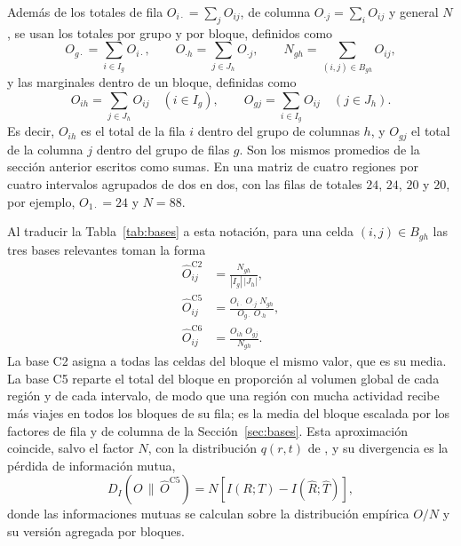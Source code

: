 Además de los totales de fila $O_{i\cdot} = \sum_j O_{ij}$, de columna
$O_{\cdot j} = \sum_i O_{ij}$ y general $N$, se usan los totales por grupo y por
bloque, definidos como
\[
  O_{g\cdot} = \sum_{i \in I_g} O_{i\cdot}, \qquad
  O_{\cdot h} = \sum_{j \in J_h} O_{\cdot j}, \qquad
  N_{gh} = \sum_{(i,j) \in B_{gh}} O_{ij},
\]
y las marginales dentro de un bloque, definidas como
\[
  O_{ih} = \sum_{j \in J_h} O_{ij} \quad (i \in I_g), \qquad
  O_{gj} = \sum_{i \in I_g} O_{ij} \quad (j \in J_h).
\]
Es decir, $O_{ih}$ es el total de la fila $i$ dentro del grupo de columnas $h$, y
$O_{gj}$ el total de la columna $j$ dentro del grupo de filas $g$. Son los mismos
promedios de la sección anterior escritos como sumas. En una matriz de cuatro
regiones por cuatro intervalos agrupados de dos en dos, con las filas de
totales $24$, $24$, $20$ y $20$, por ejemplo, $O_{1\cdot} = 24$ y $N = 88$.

Al traducir la Tabla~\ref{tab:bases} a esta notación, para una celda
$(i,j) \in B_{gh}$ las tres bases relevantes toman la forma
\begin{align}
  \hat{O}^{\mathrm{C2}}_{ij} &= \frac{N_{gh}}{|I_g|\,|J_h|}, \label{eq:c2}\\[4pt]
  \hat{O}^{\mathrm{C5}}_{ij} &= \frac{O_{i\cdot}\; O_{\cdot j}\; N_{gh}}{O_{g\cdot}\; O_{\cdot h}}, \label{eq:c5}\\[4pt]
  \hat{O}^{\mathrm{C6}}_{ij} &= \frac{O_{ih}\; O_{gj}}{N_{gh}}. \label{eq:c6}
\end{align}
La base C2 asigna a todas las celdas del bloque el mismo valor, que es su media. La base
C5 reparte el total del bloque en proporción al volumen global de cada región y de
cada intervalo, de modo que una región con mucha actividad recibe más viajes en
todos los bloques de su fila; es la media del bloque escalada por los factores de
fila y de columna de la Sección~\ref{sec:bases}. Esta aproximación coincide, salvo el factor $N$, con
la distribución $q(r,t)$ de \citet{Dhillon2003}, y su divergencia es la pérdida de información
mutua,
\begin{equation}\label{eq:perdida-im}
  D_I\!\left(O \,\|\, \hat{O}^{\mathrm{C5}}\right) = N \left[ I(R;T) - I(\hat{R};\hat{T}) \right],
\end{equation}
donde las informaciones mutuas se calculan sobre la distribución empírica $O/N$ y
su versión agregada por bloques.

